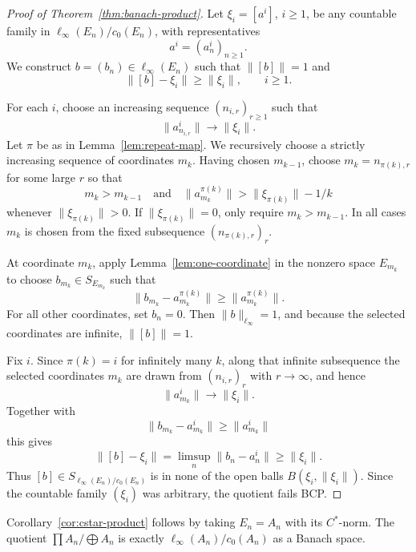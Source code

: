 \documentclass[11pt]{article}
\begin{document}
\begin{proof}[Proof of Theorem~\ref{thm:banach-product}]
Let \(\xi_i=[a^i]\), \(i\ge1\), be any countable family in
\(\ell_\infty(E_n)/c_0(E_n)\), with representatives
\[
        a^i=(a^i_n)_{n\ge1}.
\]
We construct \(b=(b_n)\in\ell_\infty(E_n)\) such that \(\|[b]\|=1\) and
\[
        \|[b]-\xi_i\|\ge \|\xi_i\|,\qquad i\ge1.
\]

For each \(i\), choose an increasing sequence \((n_{i,r})_{r\ge1}\) such that
\[
        \|a^i_{n_{i,r}}\|\longrightarrow \|\xi_i\|.
\]
Let \(\pi\) be as in Lemma~\ref{lem:repeat-map}.  We recursively choose a
strictly increasing sequence of coordinates \(m_k\).  Having chosen
\(m_{k-1}\), choose \(m_k=n_{\pi(k),r}\) for some large \(r\) so that
\[
        m_k>m_{k-1}
        \quad\text{and}\quad
        \|a^{\pi(k)}_{m_k}\|>\|\xi_{\pi(k)}\|-1/k
\]
whenever \(\|\xi_{\pi(k)}\|>0\).  If \(\|\xi_{\pi(k)}\|=0\), only require
\(m_k>m_{k-1}\).  In all cases \(m_k\) is chosen from the fixed subsequence
\((n_{\pi(k),r})_r\).

At coordinate \(m_k\), apply Lemma~\ref{lem:one-coordinate} in the nonzero
space \(E_{m_k}\) to choose \(b_{m_k}\in S_{E_{m_k}}\) such that
\[
        \|b_{m_k}-a^{\pi(k)}_{m_k}\|\ge \|a^{\pi(k)}_{m_k}\|.
\]
For all other coordinates, set \(b_n=0\).  Then \(\|b\|_{\ell_\infty}=1\), and
because the selected coordinates are infinite, \(\|[b]\|=1\).

Fix \(i\).  Since \(\pi(k)=i\) for infinitely many \(k\), along that infinite
subsequence the selected coordinates \(m_k\) are drawn from \((n_{i,r})_r\)
with \(r\to\infty\), and hence
\[
        \|a^i_{m_k}\|\longrightarrow \|\xi_i\|.
\]
Together with
\[
        \|b_{m_k}-a^i_{m_k}\|\ge \|a^i_{m_k}\|
\]
this gives
\[
        \|[b]-\xi_i\|
        =
        \limsup_n\|b_n-a^i_n\|
        \ge \|\xi_i\|.
\]
Thus \([b]\in S_{\ell_\infty(E_n)/c_0(E_n)}\) is in none of the open balls
\(B(\xi_i,\|\xi_i\|)\).  Since the countable family \((\xi_i)\) was arbitrary,
the quotient fails BCP.
\end{proof}

Corollary~\ref{cor:cstar-product} follows by taking \(E_n=A_n\) with its \(C^*\)-norm.  The
quotient \(\prod A_n/\bigoplus A_n\) is exactly
\(\ell_\infty(A_n)/c_0(A_n)\) as a Banach space.
\end{document}
